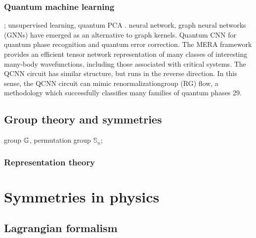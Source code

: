 
\subsubsection{Quantum machine learning}\label{sec:quantum_machine_learning}
\cite{biamonteQuantumMachineLearning2017}; 
unsupervised learning, quantum PCA \cite{lloydQuantumPrincipalComponent2014} \cite{tangQuantumPrincipalComponent2021}.
neural network,
graph neural networks (GNNs) have emerged as an alternative to graph kernels.
Quantum CNN \cite{congQuantumConvolutionalNeural2019} for quantum phase recognition and quantum error correction.
The MERA framework provides an efficient tensor network representation of many classes of interesting many-body wavefunctions, including those associated with critical systems.
The QCNN circuit has similar structure, but runs in the reverse direction.
In this sense, the QCNN circuit can mimic renormalizationgroup (RG) ﬂow, a methodology which successfully classifies many families of quantum phases 29.

\subsection{Group theory and symmetries}
group $\mathbb{G}$,
permutation group $\mathbb{S}_n$;

\subsubsection{Representation theory}\label{sec:representation_theory}

\section{Symmetries in physics}
\subsection{Lagrangian formalism}\label{sec:lagrangian}
